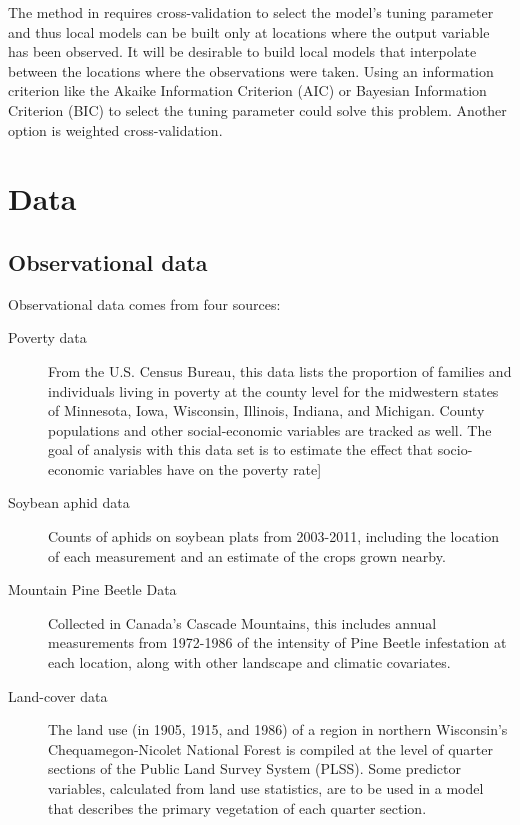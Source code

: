 \documentclass[authoryear, review, 11pt]{elsarticle}
\begin{document}
	The method in \cite{Wheeler:2009} requires cross-validation to select the model's tuning parameter and thus local models can be built only at locations where the output variable has been observed. It will be desirable to build local models that interpolate between the locations where the observations were taken. Using an information criterion like the Akaike Information Criterion (AIC) or Bayesian Information Criterion (BIC) to select the tuning parameter could solve this problem. Another option is weighted cross-validation.\\

\section{Data}
	\subsection{Observational data}
		Observational data comes from four sources:\\
		
		\begin{description}
			\item[Poverty data] From the U.S. Census Bureau, this data lists the proportion of families and individuals living in poverty at the county level for the midwestern states of Minnesota, Iowa, Wisconsin, Illinois, Indiana, and Michigan. County populations and other social-economic variables are tracked as well. The goal of analysis with this data set is to estimate the effect that socio-economic variables have on the poverty rate]
			\item[Soybean aphid data] Counts of aphids on soybean plats from 2003-2011, including the location of each measurement and an estimate of the crops grown nearby.
			\item[Mountain Pine Beetle Data] Collected in Canada's Cascade Mountains, this includes annual measurements from 1972-1986 of the intensity of Pine Beetle infestation at each location, along with other landscape and climatic covariates.
			\item[Land-cover data] The land use (in 1905, 1915, and 1986) of a region in northern Wisconsin's Chequamegon-Nicolet National Forest is compiled at the level of quarter sections of the Public Land Survey System (PLSS). Some predictor variables, calculated from land use statistics, are to be used in a model that describes the primary vegetation of each quarter section.
		\end{description}
  
\end{document}
